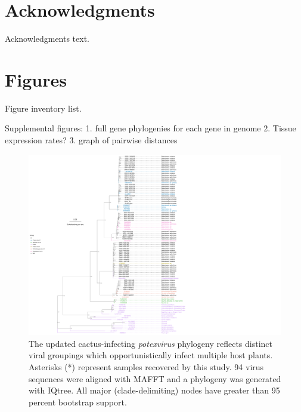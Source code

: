 \documentclass[fleqn,10pt,lineno]{wlpeerj}
\begin{document}
\section*{Acknowledgments}

Acknowledgments text.

\clearpage
%




\pagebreak
\frenchspacing
\setlength{\parindent}{0.0in}

\section*{Figures}
Figure inventory list.


Supplemental figures:
1. full gene phylogenies for each gene in genome
2. Tissue expression rates?
3. graph of pairwise distances

\begin{figure}[ht]
\centering
\includegraphics[width=1\linewidth]{full_tr_formal_tax.pdf}
 \begin{NoHyper}
 \caption{The updated cactus-infecting \textit{potexvirus} phylogeny reflects distinct viral groupings which opportunistically infect multiple host plants. Asterisks (*) represent samples recovered by this study. 94 virus sequences were aligned with MAFFT and a phylogeny was generated with IQtree. All major (clade-delimiting) nodes have greater than 95 percent bootstrap support.}
 \label{fig1}
 \end{NoHyper}
 \end{figure}
  
\end{document}
